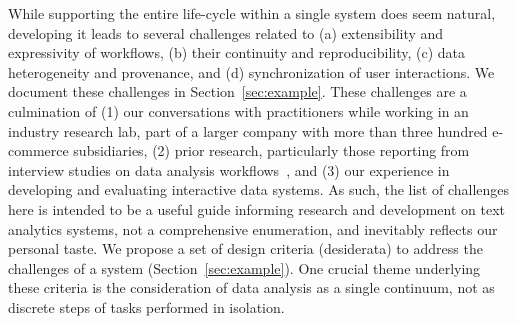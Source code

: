 
% 

While supporting the entire \vita life-cycle within a single system does seem natural, developing it leads to several challenges related to (a) extensibility and expressivity of \vita workflows, (b) their continuity and reproducibility, (c) data heterogeneity and provenance, and (d) synchronization of user interactions. We document these challenges in Section~\ref{sec:example}. These challenges are a culmination of (1) our conversations with practitioners while working in an industry research lab, part of a larger company with more than three hundred e-commerce subsidiaries, (2) prior research, particularly those  reporting from interview studies on data analysis workflows~\cite{zhang2020teddy,lee2020demystifying}, and (3) our experience in developing and evaluating interactive data systems. As such, the list of challenges here is intended to be a useful guide informing research and development on text analytics systems, not a comprehensive enumeration, and inevitably reflects our personal taste. We propose a set of design criteria (desiderata) to address the challenges of a \vita system (Section~\ref{sec:example}). One crucial theme underlying these criteria is the consideration of data analysis as a single continuum, not as discrete steps of tasks performed in isolation.


